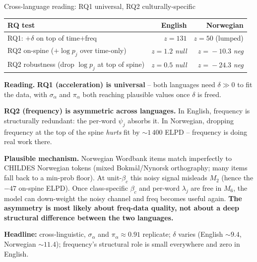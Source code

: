 \documentclass[aspectratio=169,t]{beamer}
\renewcommand{\arraystretch}{1.05}
\begin{document}
\begin{frame}{Cross-language reading: RQ1 universal, RQ2 culturally-specific}

\centering
\small
\renewcommand{\arraystretch}{1.2}
\begin{tabular}{@{}lrr@{}}
\toprule
RQ test & English & Norwegian \\
\midrule
RQ1: $+\delta$ on top of time$+$freq               & $z\!=\!131$ & $z\!=\!50$ (lumped) \\
RQ2 on-spine ($+\log p_j$ over time-only)          & $z\!=\!1.2$ \emph{null}     & $z\!=\!-10.3$ \emph{neg} \\
RQ2 robustness (drop $\log p_j$ at top of spine)   & $z\!=\!0.5$ \emph{null}     & $z\!=\!-24.3$ \emph{neg} \\
\bottomrule
\end{tabular}

\vspace{0.8em}
\flushleft
\footnotesize
\textbf{Reading.} \textbf{RQ1 (acceleration) is universal} -- both languages need
$\delta\!\gg\!0$ to fit the data, with $\sigma_\alpha$ and $\pi_\alpha$ both
reaching plausible values once $\delta$ is freed.

\textbf{RQ2 (frequency) is asymmetric across languages.} In English, frequency is
structurally redundant: the per-word $\psi_j$ absorbs it. In Norwegian, dropping
frequency at the top of the spine \emph{hurts} fit by $\sim\!1\,400$ ELPD --
frequency is doing real work there.

\textbf{Plausible mechanism.} Norwegian Wordbank items match imperfectly to
CHILDES Norwegian tokens (mixed Bokm\aa l/Nynorsk orthography; many items fall
back to a min-prob floor). At unit-$\beta_c$ this noisy signal misleads $M_2$
(hence the $-47$ on-spine ELPD). Once class-specific $\beta_c$ and per-word
$\lambda_j$ are free in $M_6$, the model can down-weight the noisy channel and
freq becomes useful again. \textbf{The asymmetry is most likely about freq-data
quality, not about a deep structural difference between the two languages.}

\vspace{0.4em}
\textbf{Headline:} cross-linguistic, $\sigma_\alpha$ and $\pi_\alpha\approx 0.91$
replicate; $\delta$ varies (English $\sim\!9.4$, Norwegian $\sim\!11.4$);
frequency's structural role is small everywhere and zero in English.

\end{frame}
\end{document}
